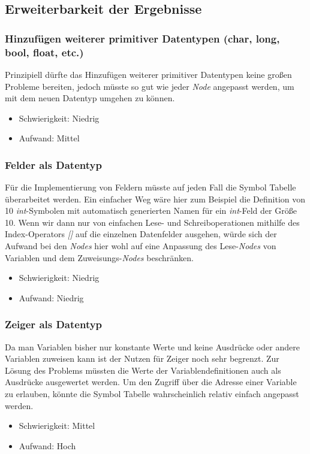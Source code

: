 \documentclass[oneside]{ausarbeitung}
\begin{document}
\subsection{Erweiterbarkeit der Ergebnisse}
\label{sub:erweiterbarkeit}

\subsubsection{Hinzufügen weiterer primitiver Datentypen (char, long, bool, float, etc.)}
Prinzipiell dürfte das Hinzufügen weiterer primitiver Datentypen keine großen Probleme bereiten, jedoch müsste so gut wie jeder \textit{Node} angepasst werden, um mit dem neuen Datentyp umgehen zu können.
\begin{itemize}
\item{Schwierigkeit: Niedrig}
\item{Aufwand: Mittel}
\end{itemize}
\subsubsection{Felder als Datentyp}
Für die Implementierung von Feldern müsste auf jeden Fall die Symbol Tabelle überarbeitet werden. Ein einfacher Weg wäre hier zum Beispiel die Definition von 10 \textit{int}-Symbolen mit automatisch generierten Namen für ein \textit{int}-Feld der Größe 10. Wenn wir dann nur von einfachen Lese- und Schreiboperationen mithilfe des Index-Operators \textit{[]} auf die einzelnen Datenfelder ausgehen, würde sich der Aufwand bei den \textit{Nodes} hier wohl auf eine Anpassung des Lese-\textit{Nodes} von Variablen und dem Zuweisungs-\textit{Nodes} beschränken.
\begin{itemize}
\item{Schwierigkeit: Niedrig}
\item{Aufwand: Niedrig}
\end{itemize}
\subsubsection{Zeiger als Datentyp}
Da man Variablen bisher nur konstante Werte und keine Ausdrücke  oder andere Variablen zuweisen kann ist der Nutzen für Zeiger noch sehr begrenzt. Zur Lösung des Problems müssten die Werte der Variablendefinitionen auch als Ausdrücke ausgewertet werden. Um den Zugriff über die Adresse einer Variable zu erlauben, könnte die Symbol Tabelle wahrscheinlich relativ einfach angepasst werden.
\begin{itemize}
\item{Schwierigkeit: Mittel}
\item{Aufwand: Hoch}
\end{itemize}
\end{document}
